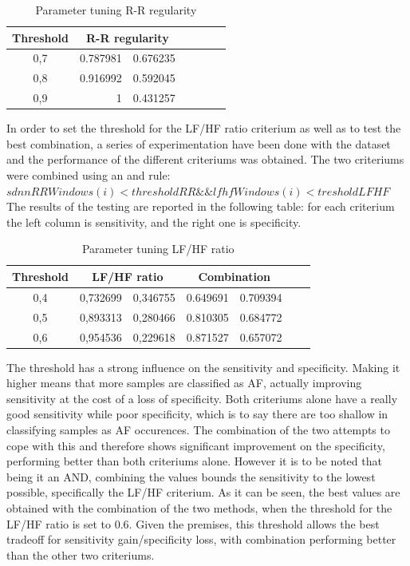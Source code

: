\documentclass[a4paper,titlepage]{article}
\begin{document}
\begin{table}[htbp]
  \centering
  \caption{Parameter tuning R-R regularity}
    \begin{tabular}{c |rr|rr|rr|}
    \multicolumn{1}{c|}{Threshold} & \multicolumn{2}{c|}{R-R regularity} & \\ \hline
    0,7   & 0.787981     & 0.676235 \\
    0,8   & 0.916992     & 0.592045 \\
    0,9   & 1     & 0.431257 \\
    \end{tabular}
  \label{tab:addlabel}
\end{table}

In order to set the threshold for the LF/HF ratio criterium as well as to test the best combination, a series of experimentation have been done with the dataset and the performance of the different criteriums was obtained.
The two criteriums were combined using an and rule:
\\$sdnnRRWindows(i) < thresholdRR \&\& lfhfWindows(i) < tresholdLFHF$\\
The results of the testing are reported in the following table: for each criterium the left column is sensitivity, and the right one is specificity.

\begin{table}[htbp]
  \centering
  \caption{Parameter tuning LF/HF ratio}
    \begin{tabular}{c |rr|rr|rr|}
    \multicolumn{1}{c|}{Threshold} & \multicolumn{2}{c|}{LF/HF ratio} & \multicolumn{2}{c|}{Combination} \\ \hline
    0,4 & 0,732699 & 0,346755 & 0.649691 & 0.709394 \\
    0,5 & 0,893313 & 0,280466 & 0.810305 & 0.684772 \\
    0,6 & 0,954536 & 0,229618 & 0.871527 & 0.657072 \\
    \end{tabular}
  \label{tab:addlabel}
\end{table}

The threshold has a strong influence on the sensitivity and specificity. Making it higher means that more samples are classified as AF, actually improving sensitivity at the cost of a loss of specificity.
Both criteriums alone have a really good sensitivity while poor specificity, which is to say there are too shallow in classifying samples as AF occurences. The combination of the two attempts to cope with this and therefore shows significant improvement on the specificity, performing better than both criteriums alone. However it is to be noted that being it an AND, combining the values bounds the sensitivity to the lowest possible, specifically the LF/HF criterium.
As it can be seen, the best values are obtained with the combination of the two methods, when the threshold for the LF/HF ratio is set to 0.6.  Given the premises, this threshold allows the best tradeoff for sensitivity gain/specificity loss, with combination performing better than the other two criteriums.
\end{document}
